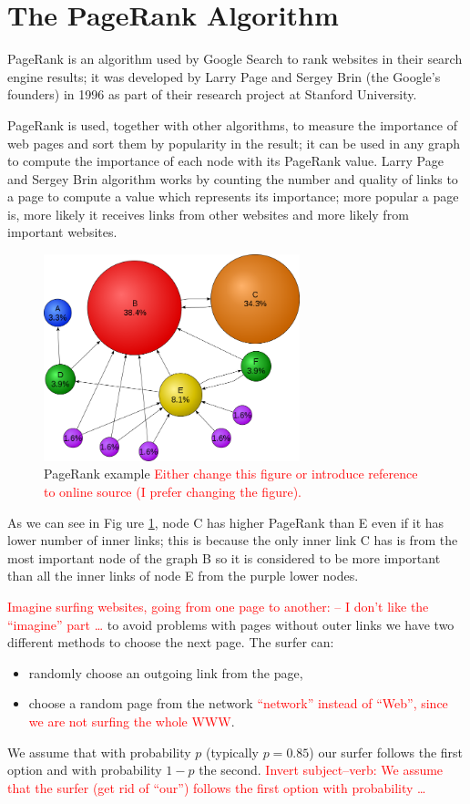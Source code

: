 \documentclass[]{usiinfbachelorproject}
\begin{document}
\section{The PageRank Algorithm} \label{sec:pagerank} 
PageRank is an algorithm used by Google Search to rank websites in their search engine results; it was developed by  Larry Page and  Sergey Brin (the Google's founders) in 1996 as part of their research project at Stanford University.

PageRank is used, together with other algorithms, to measure the importance of web pages and sort them by popularity in the result; it can be used in any graph to compute the importance of each node with its PageRank value. Larry Page and  Sergey Brin algorithm works by counting the number and quality of links to a page to compute a value which represents its importance; more popular a page is, more likely it receives links from other websites and more likely from important websites.

\begin{figure}[ht]
	\centering
	\includegraphics[height=6cm]{img/page_rank_example.png}
	\caption{PageRank example \textcolor{red}{Either change this figure or introduce reference to online source (I prefer changing the figure).}}
	\label{fig:prexample}
\end{figure}

As we can see in Fig ure \ref{fig:prexample}, node C has higher PageRank than E even if it has lower number of inner links; this is because the only inner link C has is from the most important node of the graph B so it is considered to be more important than all the inner links of node E from the purple lower nodes.

\textcolor{red}{Imagine surfing websites, going from one page to another: -- I don't like the ``imagine'' part \ldots} to avoid problems with pages without outer links we have two different methods to choose the next page. The surfer can:
\begin{itemize}
\item randomly choose an outgoing link from the page,
\item choose a random page from the network \textcolor{red}{``network'' instead of ``Web'', since we are not surfing the whole WWW}.
\end{itemize}
We assume that with probability $p$ (typically $p=0.85$) our surfer follows the first option and with probability $1-p$ the second. \textcolor{red}{Invert subject--verb: We assume that the surfer (get rid of ``our'') follows the first option with probability \ldots}
\end{document}
